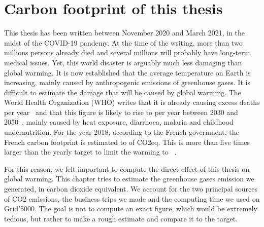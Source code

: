     \lipsum[1]

\chapter{Carbon footprint of this thesis}
\label{chapter:carbon}

    This thesis has been written between November 2020 and March 2021, in the midst of the COVID-19 pandemy. At the time
    of the writing, more than two millions persons already died and several millions will probably have long-term
    medical issues. Yet, this world disaster is arguably much less damaging than global warming. It is now established
    that the average temperature on Earth is increasing, mainly caused by anthropogenic emissions of greenhouse gases.
    It is difficult to estimate the damage that will be caused by global warming. The World Health Organization (WHO)
    writes that it is already causing  excess deaths per year~\cite{who_globalwarming_current} and that this
    figure is likely to rise to  per year between 2030 and 2050~\cite{who_globalwarming_future}, mainly
    caused by heat exposure, diarrhoea, malaria and childhood undernutrition.  For the year 2018, according to the
    French government, the French carbon footprint is estimated to  of CO2eq.  This is more than five
    times larger than the yearly  target to limit the warming to ~\cite{co2_gouv}.

    For this reason, we felt important to compute the direct effect of this thesis on global warming. This chapter tries
    to estimate the greenhouse gases emission we generated, in carbon dioxide equivalent. We account for the two
    principal sources of CO2 emissions, \ie the business trips we made and the computing time we used on Grid'5000.
    The goal is not to compute an exact figure, which would be extremely tedious, but rather to make a rough estimate
    and compare it to the  target.

